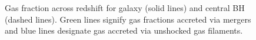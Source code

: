 \documentclass[manuscript]{aastex}
\begin{document}
\begin{figure}
\centerline{}
\caption[]{Gas fraction across redshift for galaxy (solid lines) and central BH (dashed lines). Green lines signify gas fractions accreted via mergers and blue lines designate gas accreted via unshocked gas filaments.}
\label{h277numfrac} 
\end{figure}
\end{document}

